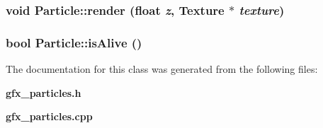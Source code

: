 \subsubsection{\setlength{\rightskip}{0pt plus 5cm}void Particle::render (float {\em z}, {\bf Texture} $\ast$ {\em texture})}\label{classEngine_1_1Particle_87b483bc7bdb07c00d366d32190c42db}


\subsubsection{\setlength{\rightskip}{0pt plus 5cm}bool Particle::isAlive ()}\label{classEngine_1_1Particle_66fd38ed0878d8baa2efb3608f27d44a}




The documentation for this class was generated from the following files:\begin{CompactItemize}
\item 
{\bf gfx\_\-particles.h}\item 
{\bf gfx\_\-particles.cpp}\end{CompactItemize}
